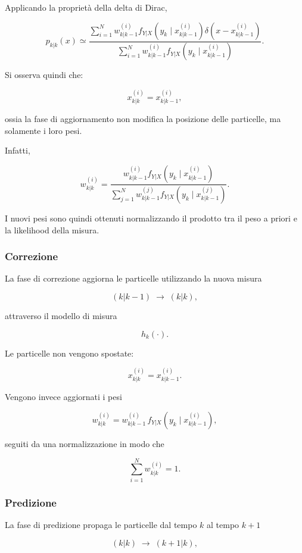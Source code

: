 \documentclass[11pt,a4paper]{article}
\begin{document}
Applicando la proprietà della delta di Dirac,

\[
\boxed{
p_{k|k}(x)
\simeq
\frac{
\displaystyle
\sum_{i=1}^{N}
w_{k|k-1}^{(i)}
f_{Y|X}\!\left(
y_k
\mid
x_{k|k-1}^{(i)}
\right)
\delta\!\left(
x-x_{k|k-1}^{(i)}
\right)
}{
\displaystyle
\sum_{i=1}^{N}
w_{k|k-1}^{(i)}
f_{Y|X}\!\left(
y_k
\mid
x_{k|k-1}^{(i)}
\right)
}.
}
\]

Si osserva quindi che:

\[
\boxed{
x_{k|k}^{(i)}
=
x_{k|k-1}^{(i)},
}
\]

ossia la fase di aggiornamento non modifica la posizione delle particelle, ma solamente i loro pesi.

Infatti,

\[
\boxed{
w_{k|k}^{(i)}
=
\frac{
w_{k|k-1}^{(i)}
f_{Y|X}\!\left(
y_k
\mid
x_{k|k-1}^{(i)}
\right)
}{
\displaystyle
\sum_{j=1}^{N}
w_{k|k-1}^{(j)}
f_{Y|X}\!\left(
y_k
\mid
x_{k|k-1}^{(j)}
\right)
}.
}
\]

I nuovi pesi sono quindi ottenuti normalizzando il prodotto tra il peso a priori e la likelihood della 
misura.


\subsubsection*{Correzione}

La fase di correzione aggiorna le particelle utilizzando la nuova misura

\[
(k|k-1)
\;\longrightarrow\;
(k|k),
\]

attraverso il modello di misura

\[
h_k(\cdot).
\]

Le particelle non vengono spostate:

\[
\boxed{
x_{k|k}^{(i)}
=
x_{k|k-1}^{(i)}.
}
\]

Vengono invece aggiornati i pesi

\[
\boxed{
w_{k|k}^{(i)}
=
w_{k|k-1}^{(i)}
\,f_{Y|X}
\!\left(
y_k
\mid
x_{k|k-1}^{(i)}
\right),
}
\]

seguiti da una normalizzazione in modo che

\[
\sum_{i=1}^{N}w_{k|k}^{(i)}=1.
\]

\subsubsection*{Predizione}

La fase di predizione propaga le particelle dal tempo \(k\) al tempo \(k+1\)

\[
(k|k)
\;\longrightarrow\;
(k+1|k),
\]
\end{document}
